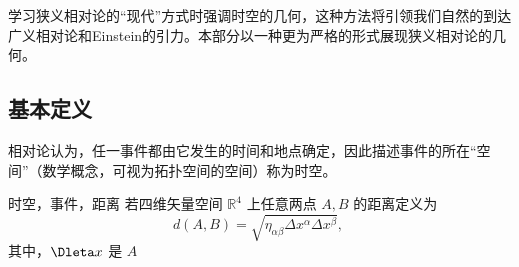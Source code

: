 
学习狭义相对论的“现代”方式时强调时空的几何，这种方法将引领我们自然的到达广义相对论和Einstein的引力。本部分以一种更为严格的形式展现狭义相对论的几何。

\subsection{基本定义}
相对论认为，任一事件都由它发生的时间和地点确定，因此描述事件的所在“空间”（数学概念，可视为拓扑空间的空间）称为时空。
\begin{definition}{时空，事件，距离}
若四维矢量空间 $\mathbb R^4$ 上任意两点 $A,B$ 的距离定义为
\begin{equation}
d(A,B)=\sqrt{\eta_{\alpha\beta}\Delta x^\alpha\Delta x^\beta},~
\end{equation}
其中，$\Dleta x$ 是 $A$
\end{definition}























